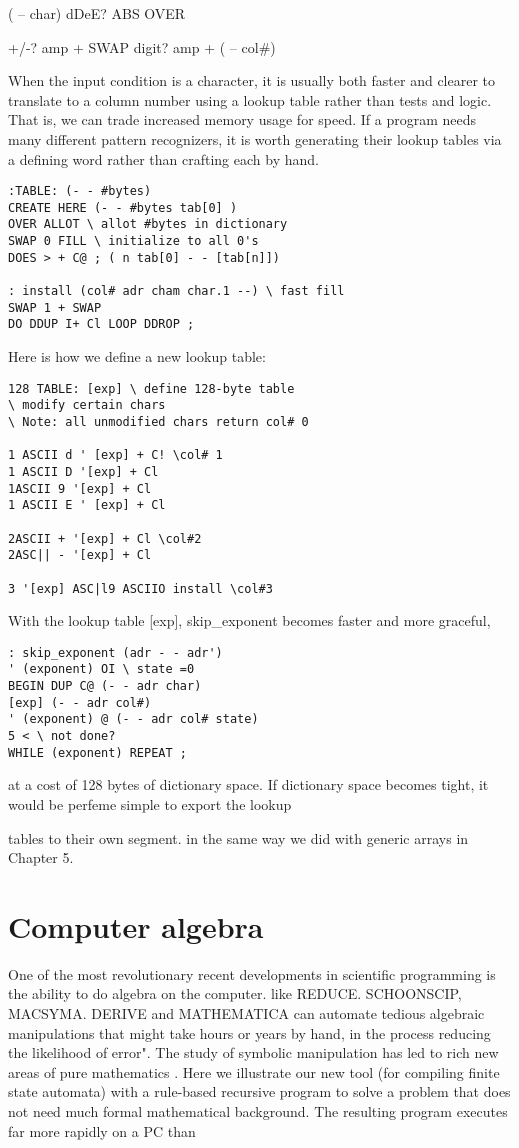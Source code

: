 ( -- char) dDeE? ABS OVER

+/-? amp + SWAP
digit? amp + ( -- col\#)


When the input condition is a character, it is usually both faster
and clearer to translate to a column number using a lookup table
rather than tests and logic. That is, we can trade increased
memory usage for speed. If a program needs many different
pattern recognizers, it is worth generating their lookup tables via
a defining word rather than crafting each by hand.
\begin{verbatim}
:TABLE: (- - #bytes)
CREATE HERE (- - #bytes tab[0] )
OVER ALLOT \ allot #bytes in dictionary
SWAP 0 FILL \ initialize to all 0's
DOES > + C@ ; ( n tab[0] - - [tab[n]])

: install (col# adr cham char.1 --) \ fast fill
SWAP 1 + SWAP
DO DDUP I+ Cl LOOP DDROP ;
\end{verbatim}
Here is how we define a new lookup table:
\begin{verbatim}
128 TABLE: [exp] \ define 128-byte table
\ modify certain chars
\ Note: all unmodified chars return col# 0

1 ASCII d ' [exp] + C! \col# 1
1 ASCII D '[exp] + Cl
1ASCII 9 '[exp] + Cl
1 ASCII E ' [exp] + Cl

2ASCII + '[exp] + Cl \col#2
2ASC|| - '[exp] + Cl

3 '[exp] ASC|l9 ASCIIO install \col#3
\end{verbatim}
With the lookup table [exp], skip\_exponent becomes faster
and more graceful,

\begin{verbatim}
: skip_exponent (adr - - adr')
' (exponent) OI \ state =0
BEGIN DUP C@ (- - adr char)
[exp] (- - adr col#)
' (exponent) @ (- - adr col# state)
5 < \ not done?
WHILE (exponent) REPEAT ;
\end{verbatim}

at a cost of 128 bytes of dictionary space. If dictionary space becomes tight, it would be perfeme simple to export the lookup

tables to their own segment. in the same way we did with generic arrays in Chapter 5.

\section{Computer algebra}

One of the most revolutionary recent developments in scientiﬁc
programming is the ability to do algebra on the computer.
like REDUCE. SCHOONSCIP, MACSYMA.
DERIVE and MATHEMATICA can automate tedious algebraic
manipulations that might take hours or years by hand, in the
process reducing the likelihood of error". The study of symbolic
manipulation has led to rich new areas of pure mathematics .
Here we illustrate our new tool (for compiling ﬁnite state
automata) with a rule-based recursive program to solve a problem that does not need much formal mathematical background. The resulting program executes far more rapidly on a PC than

